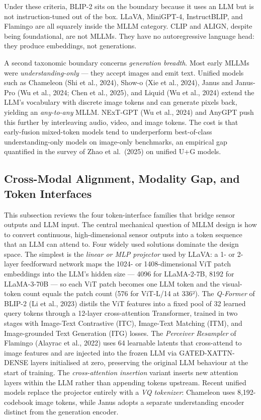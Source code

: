 Under these criteria, BLIP-2 sits on the boundary because it uses an LLM but is not instruction-tuned out of the box. LLaVA, MiniGPT-4, InstructBLIP, and Flamingo are all squarely inside the MLLM category. CLIP and ALIGN, despite being foundational, are not MLLMs. They have no autoregressive language head: they produce embeddings, not generations.

A second taxonomic boundary concerns \emph{generation breadth}. Most early MLLMs were \emph{understanding-only} --- they accept images and emit text. Unified models such as Chameleon (Shi et al., 2024), Show-o (Xie et al., 2024), Janus and Janus-Pro (Wu et al., 2024; Chen et al., 2025), and Liquid (Wu et al., 2024) extend the LLM's vocabulary with discrete image tokens and can generate pixels back, yielding an \emph{any-to-any} MLLM. NExT-GPT (Wu et al., 2024) and AnyGPT push this further by interleaving audio, video, and image tokens. The cost is that early-fusion mixed-token models tend to underperform best-of-class understanding-only models on image-only benchmarks, an empirical gap quantified in the survey of Zhao et al.~(2025) on unified U+G models.

\subsection{Cross-Modal Alignment, Modality Gap, and Token Interfaces}\label{cross-modal-alignment-modality-gap-and-token-interfaces}

This subsection reviews the four token-interface families that bridge sensor outputs and LLM input. The central mechanical question of MLLM design is how to convert continuous, high-dimensional sensor outputs into a token sequence that an LLM can attend to. Four widely used solutions dominate the design space. The simplest is the \emph{linear or MLP projector} used by LLaVA: a 1- or 2-layer feedforward network maps the 1024- or 1408-dimensional ViT patch embeddings into the LLM's hidden size --- 4096 for LLaMA-2-7B, 8192 for LLaMA-3-70B --- so each ViT patch becomes one LLM token and the visual-token count equals the patch count (576 for ViT-L/14 at 336²). The \emph{Q-Former} of BLIP-2 (Li et al., 2023) distils the ViT features into a fixed pool of 32 learned query tokens through a 12-layer cross-attention Transformer, trained in two stages with Image-Text Contrastive (ITC), Image-Text Matching (ITM), and Image-grounded Text Generation (ITG) losses. The \emph{Perceiver Resampler} of Flamingo (Alayrac et al., 2022) uses 64 learnable latents that cross-attend to image features and are injected into the frozen LLM via GATED-XATTN-DENSE layers initialised at zero, preserving the original LLM behaviour at the start of training. The \emph{cross-attention insertion} variant inserts new attention layers within the LLM rather than appending tokens upstream. Recent unified models replace the projector entirely with a \emph{VQ tokenizer}: Chameleon uses 8,192-codebook image tokens, while Janus adopts a separate understanding encoder distinct from the generation encoder.

